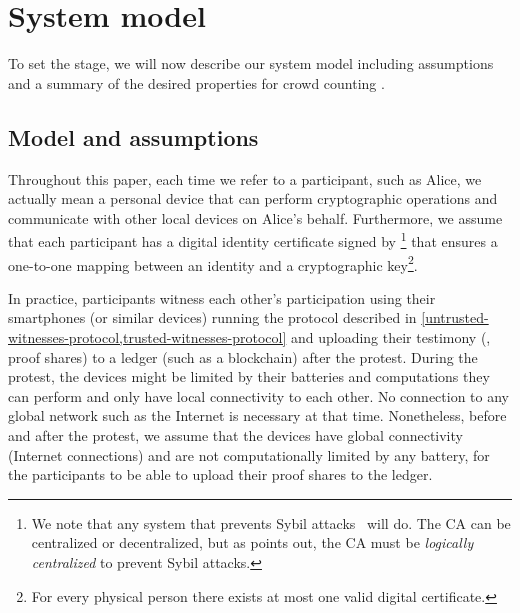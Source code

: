 \section{System model}%
\label{system-model}

To set the stage, we will now describe our system model including
assumptions and a summary of the desired properties for crowd
counting%
.

\subsection{Model and assumptions}%
\label{assumptions}

Throughout this paper, each time we refer to a participant, such as Alice, we 
actually mean a personal device that can perform cryptographic operations and 
communicate with other local devices on Alice's behalf.
Furthermore, we assume that each participant has a digital identity certificate signed 
by \footnote{%
  We note that any system that prevents Sybil attacks~\cite{SybilAttack} will 
  do.
  The \ac{CA} can be centralized or decentralized, but as 
  \textcite{SybilAttack} points out, the \ac{CA} must be \emph{logically 
    centralized} to prevent Sybil attacks.
 } that ensures a one-to-one mapping between an identity and a cryptographic 
key\footnote{%
  For every physical person there exists at most one valid digital certificate.
}.

In practice, participants witness each other's participation using
their smartphones (or similar devices) running the protocol described
in \cref{untrusted-witnesses-protocol,trusted-witnesses-protocol} and uploading 
their testimony (\ie, proof shares)
to a ledger (such as a blockchain) after the protest.  During the
protest, the devices might be limited by their batteries and
computations they can perform and only have local connectivity to each
other.  No connection to any global network such as the Internet is
necessary at that time.  Nonetheless, before and after the protest, we
assume that the devices have global connectivity (\ie Internet
connections) and are not computationally limited by any battery, for
the participants to be able to upload their proof shares to the
ledger.




